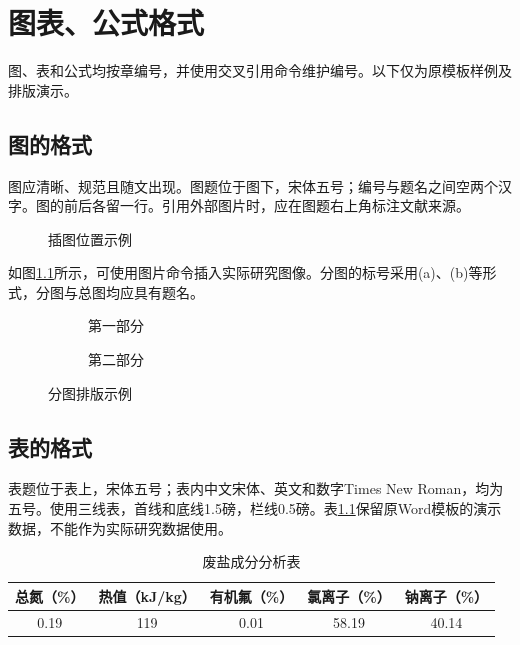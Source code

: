 \chapter{图表、公式格式}
图、表和公式均按章编号，并使用交叉引用命令维护编号。以下仅为原模板样例及排版演示。
\section{图的格式}
图应清晰、规范且随文出现。图题位于图下，宋体五号；编号与题名之间空两个汉字。图的前后各留一行。引用外部图片时，应在图题右上角标注文献来源。

\begin{figure}[htbp]
  \centering
  \caption{插图位置示例}\label{fig:placeholder}
\end{figure}

如图\ref{fig:placeholder}所示，可使用图片命令插入实际研究图像。分图的标号采用(a)、(b)等形式，分图与总图均应具有题名。

\begin{figure}[htbp]
  \centering
  \begin{subfigure}{0.46\linewidth}
    \centering{}
    \caption{第一部分}
  \end{subfigure}\hfill
  \begin{subfigure}{0.46\linewidth}
    \centering{}
    \caption{第二部分}
  \end{subfigure}
  \caption{分图排版示例}\label{fig:subfigures}
\end{figure}

\section{表的格式}
表题位于表上，宋体五号；表内中文宋体、英文和数字Times New Roman，均为五号。使用三线表，首线和底线1.5磅，栏线0.5磅。表\ref{tab:salt}保留原Word模板的演示数据，不能作为实际研究数据使用。

\begin{table}[htbp]
  \caption{废盐成分分析表}\label{tab:salt}
  \centering
  \begin{thesistable}
    \begin{tabular}{ccccc}
      \toprule
      总氮（\%）&热值（kJ/kg）&有机氟（\%）&氯离子（\%）&钠离子（\%）\\
      \midrule
      0.19&119&0.01&58.19&40.14\\
      \bottomrule
    \end{tabular}
  \end{thesistable}
\end{table}

